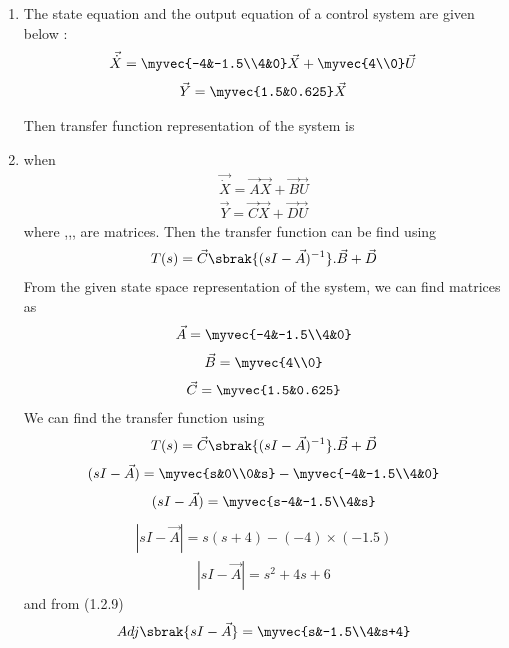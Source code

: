 \begin{enumerate}[label=\thesection.\arabic*.,ref=\thesection.\theenumi]

\item
The state equation and the output equation of a control system are given below : 
\begin{align}
    \vec{\dot X}=\myvec{-4&-1.5\\4&0}\vec{X} + \myvec{4\\0}\vec{U}   
\end{align}
\begin{align}
    \vec{Y} = \myvec{1.5&0.625}\vec{X}
\end{align}
  
Then transfer function representation of the system is 


\item 
\solution
when
\begin{align}
    \vec{\dot{X}} = \vec{A}\vec{X} + \vec{B}\vec{U}
\end{align}
\begin{align}
    \vec{Y} = \vec{C}\vec{X} + \vec{D}\vec{U}
\end{align}
\vskip 0.1cm
where ,,,  are matrices.
  Then the  transfer  function can be find using
\vskip 0.1cm
\begin{align}
    T(s) = \vec{C}\sbrak{(sI-\vec{A})^{-1}}.\vec{B} + \vec{D}
\end{align}
\vskip 0.1cm
From the given state space representation of the system, we can find matrices as
\begin{align}
    \vec{A}= \myvec{-4&-1.5\\4&0}
\end{align}
\begin{align}
    \vec{B} = \myvec{4\\0}
\end{align}
\begin{align}
     \vec{C} = \myvec{1.5&0.625}
\end{align}
We can find the transfer function using
\begin{align}
    T(s) = \vec{C}\sbrak{(sI-\vec{A})^{-1}}.\vec{B} + \vec{D}
\end{align}
\begin{align}
    (sI - \vec{A}) =  \myvec{s&0\\0&s} -  \myvec{-4&-1.5\\4&0}
\end{align}
\begin{align}
    (sI - \vec{A}) =  \myvec{s-4&-1.5\\4&s}
\end{align}
\begin{align}
    |sI - \vec{A}| = s(s+4) - (-4)\times (-1.5)
\end{align}
\vskip 0.1cm
\begin{align}
    |sI - \vec{A}| = s^2 + 4s+ 6
\end{align}
\vskip 0.1cm
and from (1.2.9)
\begin{align}
    Adj\sbrak{sI - \vec{A}} =  \myvec{s&-1.5\\4&s+4}
\end{align}


\end{enumerate}

